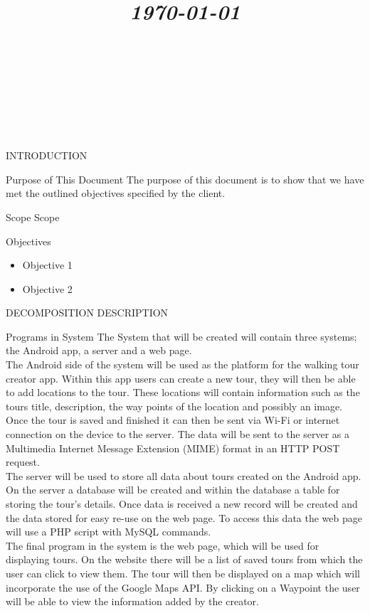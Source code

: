 \documentclass{article}
\title{
	\vspace{1.2in}
	\textmd{\textbf{\doctitle}} \\
	\vspace{0.1in}\large{\textit{\today}} \\
	\vspace{0.4in}
	{\bf{\qanumber}} \\ \vspace{0.4in}
	\version \\
	\status \\
	\vspace{0.4in}
}
\author{\authors}
\date{}
\begin{document}
	\maketitle
	\newpage
	\tableofcontents
	\newpage

	\begin{section}{INTRODUCTION}
		\begin{subsection}{Purpose of This Document}
			The purpose of this document is to show that we have met the outlined objectives specified by the client.
		\end{subsection}
	
		\begin{subsection}{Scope}
			Scope
		\end{subsection}
		
		\begin{subsection}{Objectives}
			\begin{itemize}
				\item{Objective 1}
				\item{Objective 2}
			\end{itemize}
		\end{subsection}
	\end{section}
	
	\begin{section}{DECOMPOSITION DESCRIPTION}
		\begin{subsection}{Programs in System}
		The System that will be created will contain three systems; the Android app, a server and a web page. \\

		The Android side of the system will be used as the platform for the walking tour creator app. Within this app users can create a new tour, they will then be able to add locations to the tour. These locations will contain information such as the tours title, description, the way points of the location and possibly an image. Once the tour is saved and finished it can then be sent via Wi-Fi or internet connection on the device to the server. The data will be sent to the server as a Multimedia Internet Message Extension (MIME) format in an HTTP POST request.\\

		The server will be used to store all data about tours created on the Android app. On the server a database will be created and within the database a table for storing the tour's details. Once data is received a new record will be created and the data stored for easy re-use on the web page. To access this data the web page will use a PHP script with MySQL commands.\\

		The final program in the system is the web page, which will be used for displaying tours. On the website there will be a list of saved tours from which the user can click to view them. The tour will then be displayed on a map which will incorporate the use of the Google Maps API. By clicking on a Waypoint the user will be able to view the information added by the creator.
		\end{subsection}
	\end{section}
	
\end{document}
